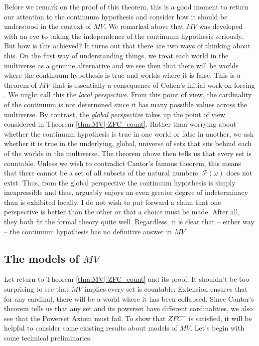 \documentclass[10pt,a4paper]{amsart}
\numberwithin{equation}{section}
\numberwithin{figure}{section}
\theoremstyle{plain}
\theoremstyle{plain}
\theoremstyle{plain}
\theoremstyle{plain}
\theoremstyle{remark}
\theoremstyle{plain}
\theoremstyle{definition}
\begin{document}
Before we remark on the proof of this theorem, this is a good moment
to return our attention to the continuum hypothesis and consider how
it should be understood in the context of $MV$. We remarked above
that $MV$ was developed with an eye to taking the independence of
the continuum hypothesis seriously. But how is this achieved? It turns
out that there are two ways of thinking about this. On the first way
of understanding things, we treat each world in the multiverse as
a genuine alternative and we see then that there will be worlds where
the continuum hypothesis is true and worlds where it is false. This
is a theorem of $MV$ that is essentially a consequence of Cohen's
initial work on forcing \citep{Cohen1963-COHTIO-5}. We might call
this the \emph{local perspective}. From this point of view, the cardinality
of the continuum is not determined since it has many possible values
across the multiverse. By contrast, the \emph{global perspective}
takes up the point of view considered in Theorem \ref{thm:MV|-ZFC_count}.
Rather than worrying about whether the continuum hypothesis is true
in one world or false in another, we ask whether it is true in the
underlying, global, universe of sets that sits behind each of the
worlds in the multiverse. The theorem above then tells us that every
set is countable. Unless we wish to contradict Cantor's famous theorem,
this means that there cannot be a set of all subsets of the natural
numbers: $\mathcal{P}(\omega)$ does not exist. Thus, from the global
perspective the continuum hypothesis is simply inexpressible and thus,
arguably enjoys an even greater degree of indeterminacy than is exhibited
locally. I do not wish to put forward a claim that one perspective
is better than the other or that a choice must be made. After all,
they both fit the formal theory quite well. Regardless, it is clear
that -- either way -- the continuum hypothesis has no definitive
answer in $MV$. 

\subsection{The models of $MV$}

Let return to Theorem \ref{thm:MV|-ZFC_count} and its proof. It shouldn't
be too surprising to see that $MV$ implies every set is countable:
Extension ensures that for any cardinal, there will be a world where
it has been collapsed. Since Cantor's theorem tells us that any set
and its powerset have different cardinalities, we also see that the
Powerset Axiom must fail. To show that $ZFC^{-}$ is satisfied, it
will be helpful to consider some existing results about models of
$MV$. Let's begin with some technical preliminaries.
\end{document}
